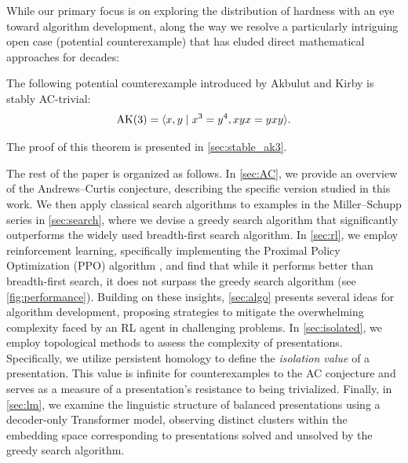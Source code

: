 While our primary focus is on exploring the distribution of hardness with an eye toward algorithm development, along the way we resolve a particularly intriguing open case (potential counterexample) that has eluded direct mathematical approaches for decades:

\begin{theorem}\label{thm:stableAK3}
    The following potential counterexample introduced by Akbulut and Kirby \cite{Akbulut--Kirby} is stably AC-trivial:
    \[
    \text{AK}(3) = \langle x, y \mid x^3 = y^{4}, xyx = yxy\rangle.
    \]
\end{theorem}

\noindent
The proof of this theorem is presented in \autoref{sec:stable_ak3}.

The rest of the paper is organized as follows. In \autoref{sec:AC}, we provide an overview of the Andrews--Curtis conjecture, describing the specific version studied in this work. We then apply classical search algorithms to examples in the Miller--Schupp series in \autoref{sec:search}, where we devise a greedy search algorithm that significantly outperforms the widely used breadth-first search algorithm. In \autoref{sec:rl}, we employ reinforcement learning, specifically implementing the Proximal Policy Optimization (PPO) algorithm \cite{schulman2017proximal}, and find that while it performs better than breadth-first search, it does not surpass the greedy search algorithm (see \autoref{fig:performance}). Building on these insights, \autoref{sec:algo} presents several ideas for algorithm development, proposing strategies to mitigate the overwhelming complexity faced by an RL agent in challenging problems. In \autoref{sec:isolated}, we employ topological methods to assess the complexity of presentations. Specifically, we utilize persistent homology to define the \textit{isolation value} of a presentation. This value is infinite for counterexamples to the AC conjecture and serves as a measure of a presentation's resistance to being trivialized. Finally, in \autoref{sec:lm}, we examine the linguistic structure of balanced presentations using a decoder-only Transformer model, observing distinct clusters within the embedding space corresponding to presentations solved and unsolved by the greedy search algorithm.

